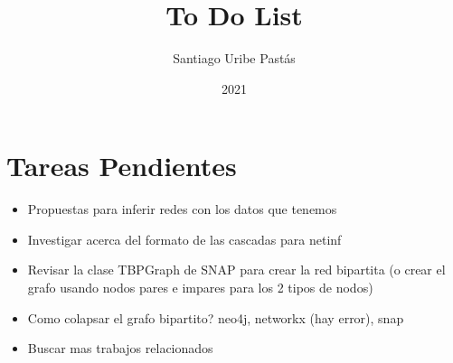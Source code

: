 \documentclass{article}
\title{To Do List}
\author{Santiago Uribe Pastás}
\date{2021}
\begin{document}
\maketitle

\section{Tareas Pendientes}
\begin{itemize}
    \item Propuestas para inferir redes con los datos que tenemos
    \item Investigar acerca del formato de las cascadas para netinf
    \item Revisar la clase TBPGraph de SNAP para crear la red bipartita (o crear el grafo usando nodos pares e impares para los 2 tipos de nodos)
    \item Como colapsar el grafo bipartito? neo4j, networkx (hay error), snap
    \item Buscar mas trabajos relacionados
\end{itemize}
\end{document}
